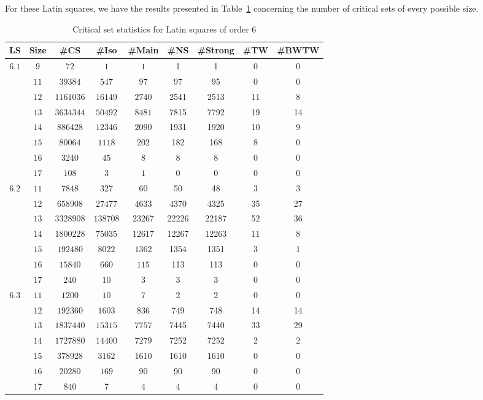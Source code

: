 \documentclass[12pt]{report}
\begin{document}
For these Latin squares, we have the results presented in Table~\ref{four} concerning the number
of critical sets of every possible size.

\begin{table}
\begin{center}
\caption{Critical set statistics for Latin squares of order 6}
\label{four}
\begin{tabular}{|c|c|c|c|c|c|c|c|c|} \hline
 LS & Size & \#CS & \#Iso & \#Main& \#NS & \#Strong & \#TW & \#BWTW \\ \hline
$6.1$ & $9$  & $72$    & $1$    & $1$ & 1 & 1 & 0 & 0 \\
      & $11$  & $39384$ & $547$  & $97$ & 97 & 95 & 0 & 0  \\
      & $12$  & $1161036$ & $16149$  & $2740$ & 2541 & 2513 & 11 & 8 \\
      & $13$  & $3634344$ & $50492$  & $8481$ & 7815 & 7792 & 19 & 14 \\
      & $14$  & $886428$ & $12346$  & $2090$ & 1931 & 1920 & 10 & 9 \\
      & $15$  & $80064$ & $1118$  & $202$ & 182 & 168 & 8 & 0 \\
      & $16$  & $3240$ & $45$  & $8$ & 8 & 8 & 0 & 0 \\
      & $17$  & $108$  & $3$   & $1$ & 0 & 0 & 0 & 0 \\ \hline
$6.2$ & $11$  & $7848$ & $327$  & $60$ & 50 & 48 & 3 & 3 \\
      & $12$  & $658908$ & $27477$  & $4633$ & 4370 & 4325 & 35 & 27 \\
      & $13$  & $3328908$ & $138708$  & $23267$ & 22226 & 22187 & 52 & 36 \\
      & $14$  & $1800228$ & $75035$  & $12617$ & 12267 & 12263 & 11 & 8 \\
      & $15$  & $192480$ & $8022$  & $1362$ & 1354 & 1351 & 3 & 1 \\
      & $16$  & $15840$ & $660$  & $115$ & 113 & 113 & 0 & 0 \\
      & $17$  & $240$  & $10$   & $3$ & 3 & 3 & 0 & 0  \\ \hline
$6.3$ & $11$  & $1200$ & $10$  & $7$ & 2 & 2 & 0 & 0 \\
      & $12$  & $192360$ & $1603$  & $836$ & 749 & 748 & 14 & 14 \\
      & $13$  & $1837440$ & $15315$  & $7757$ & 7445 & 7440 & 33 & 29 \\
      & $14$  & $1727880$ & $14400$  & $7279$ & 7252 & 7252 & 2 & 2 \\
      & $15$  & $378928$ & $3162$  & $1610$ & 1610 & 1610 & 0 & 0 \\
      & $16$  & $20280$ & $169$  & $90$ & 90 & 90 & 0 & 0 \\
      & $17$  & $840$  & $7$   & $4$ & 4 & 4 & 0 & 0 \\ \hline
\end{tabular}\vspace {3mm} \\
\end{center}
\end{table}
\end{document}
